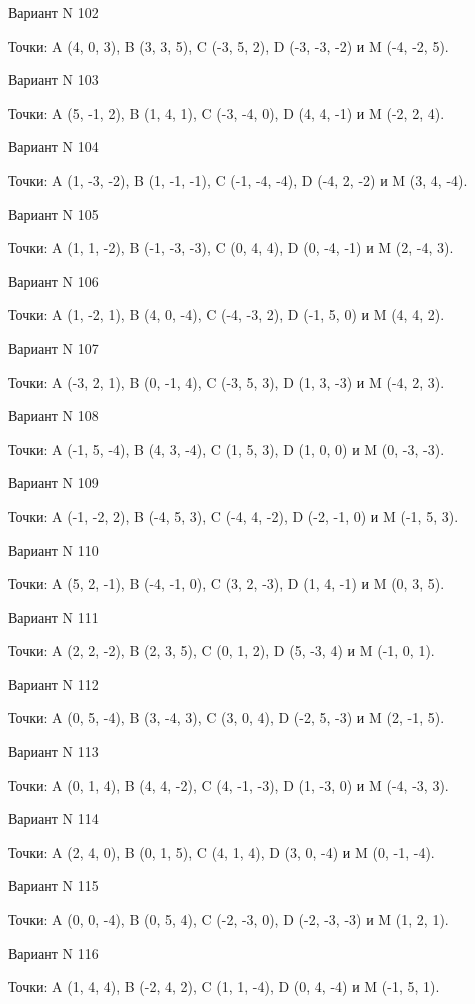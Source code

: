 \documentclass[11pt]{report}
\begin{document}
Вариант N 102

Точки: A (4, 0, 3), B (3, 3, 5), C (-3, 5, 2), D (-3, -3, -2) и M (-4, -2, 5).

Вариант N 103

Точки: A (5, -1, 2), B (1, 4, 1), C (-3, -4, 0), D (4, 4, -1) и M (-2, 2, 4).

Вариант N 104

Точки: A (1, -3, -2), B (1, -1, -1), C (-1, -4, -4), D (-4, 2, -2) и M (3, 4, -4).

Вариант N 105

Точки: A (1, 1, -2), B (-1, -3, -3), C (0, 4, 4), D (0, -4, -1) и M (2, -4, 3).

Вариант N 106

Точки: A (1, -2, 1), B (4, 0, -4), C (-4, -3, 2), D (-1, 5, 0) и M (4, 4, 2).

Вариант N 107

Точки: A (-3, 2, 1), B (0, -1, 4), C (-3, 5, 3), D (1, 3, -3) и M (-4, 2, 3).

Вариант N 108

Точки: A (-1, 5, -4), B (4, 3, -4), C (1, 5, 3), D (1, 0, 0) и M (0, -3, -3).

Вариант N 109

Точки: A (-1, -2, 2), B (-4, 5, 3), C (-4, 4, -2), D (-2, -1, 0) и M (-1, 5, 3).

Вариант N 110

Точки: A (5, 2, -1), B (-4, -1, 0), C (3, 2, -3), D (1, 4, -1) и M (0, 3, 5).

Вариант N 111

Точки: A (2, 2, -2), B (2, 3, 5), C (0, 1, 2), D (5, -3, 4) и M (-1, 0, 1).

Вариант N 112

Точки: A (0, 5, -4), B (3, -4, 3), C (3, 0, 4), D (-2, 5, -3) и M (2, -1, 5).

Вариант N 113

Точки: A (0, 1, 4), B (4, 4, -2), C (4, -1, -3), D (1, -3, 0) и M (-4, -3, 3).

Вариант N 114

Точки: A (2, 4, 0), B (0, 1, 5), C (4, 1, 4), D (3, 0, -4) и M (0, -1, -4).

Вариант N 115

Точки: A (0, 0, -4), B (0, 5, 4), C (-2, -3, 0), D (-2, -3, -3) и M (1, 2, 1).

Вариант N 116

Точки: A (1, 4, 4), B (-2, 4, 2), C (1, 1, -4), D (0, 4, -4) и M (-1, 5, 1).
\end{document}

